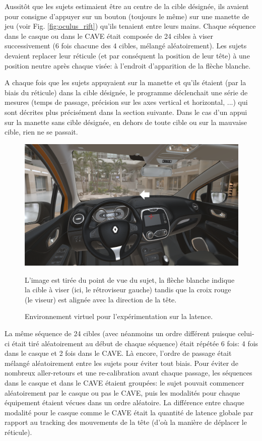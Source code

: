 	\par Aussitôt que les sujets estimaient être au centre de la cible désignée, ils avaient pour consigne d'appuyer sur un bouton (toujours le même) sur une manette de jeu (voir Fig. \ref{fig:oculus_rift}) qu'ils tenaient entre leurs mains. Chaque séquence dans le casque ou dans le CAVE était composée de 24 cibles à viser successivement (6 fois chacune des 4 cibles, mélangé aléatoirement). Les sujets devaient replacer leur réticule (et par conséquent la position de leur tête) à une position neutre après chaque visée: à l'endroit d'apparition de la flèche blanche.
	
	\par A chaque fois que les sujets appuyaient sur la manette et qu'ils étaient (par la biais du réticule) dans la cible désignée, le programme déclenchait une série de mesures (temps de passage, précision sur les axes vertical et horizontal, ...) qui sont décrites plus précisément dans la section suivante. Dans le cas d'un appui sur la manette sans cible désignée, en dehors de toute cible ou sur la mauvaise cible, rien ne se passait.
	
	\begin{figure}
		\centering
		\includegraphics[scale=.9]{Figures/ExpeLatency}
		\caption{Environnement virtuel pour l'expérimentation sur la latence.}{L'image est tirée du point de vue du sujet, la flèche blanche indique la cible à viser (ici, le rétroviseur gauche) tandis que la croix rouge (le viseur) est alignée avec la direction de la tête.}
		\label{fig:apparatus_latency}
	\end{figure}
	
	\par La même séquence de 24 cibles (avec néanmoins un ordre différent puisque celui-ci était tiré aléatoirement au début de chaque séquence) était répétée 6 fois: 4 fois dans le casque et 2 fois dans le CAVE. Là encore, l'ordre de passage était mélangé aléatoirement entre les sujets pour éviter tout biais. Pour éviter de nombreux aller-retours et une re-calibration avant chaque passage, les séquences dans le casque et dans le CAVE étaient groupées: le sujet pouvait commencer aléatoirement par le casque ou pas le CAVE, puis les modalités pour chaque équipement étaient vécues dans un ordre aléatoire. La différence entre chaque modalité pour le casque comme le CAVE était la quantité de latence globale par rapport au tracking des mouvements de la tête (d'où la manière de déplacer le réticule).
	
